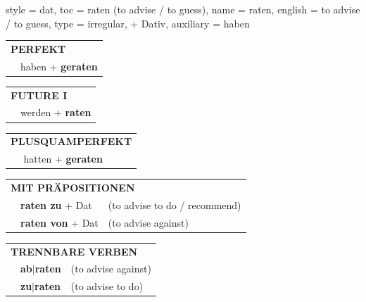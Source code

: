 \begin{verbentry}{
  style = {dat},
  toc = {raten (to advise / to guess)},
  name = {raten},
  english = {to advise / to guess},
  type = {irregular, + Dativ},
  auxiliary = {haben}
}
 \begin{tabular}{rl}
     \multicolumn{2}{l}{\textbf{PERFEKT}}\\
   & haben + \textbf{geraten}\\
  \end{tabular}
\hfill
   \begin{tabular}{rl}
   
    \multicolumn{2}{l}{\textbf{FUTURE I} }\\
   & werden + \textbf{raten}\\
 
  \end{tabular}
\hfill
   \begin{tabular}{rl}
      \multicolumn{2}{l}{\textbf{PLUSQUAMPERFEKT}}\\
   & hatten + \textbf{geraten}\\
  \end{tabular}

   \vspace{10pt}

   \begin{tabular}{lll}
      \multicolumn{3}{l}{\textbf{MIT PRÄPOSITIONEN}}\\
& \textbf{raten zu} + Dat & (to advise to do / recommend)\\
& \textbf{raten von} + Dat & (to advise against)\\
\end{tabular}
  \hfill
   \begin{tabular}{lll}
      \multicolumn{3}{l}{\textbf{TRENNBARE VERBEN}}\\
 & \textbf{ab$|$raten} & (to advise against)\\
 & \textbf{zu$|$raten} & (to advise to do)\\
  \end{tabular}


  \vspace{-5pt}
\end{verbentry}

